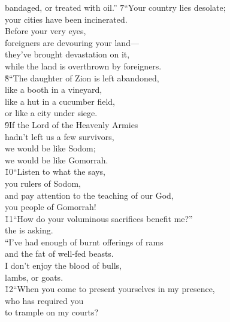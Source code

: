 \begin{poetry}
\poemll    bandaged, or treated with oil.''
\poeml \v{7}``Your country lies desolate; \\
\poemll    your cities have been incinerated. \\
\poeml Before your very eyes, \\
\poemll    foreigners are devouring your land--- \\
\poeml they've brought devastation on it, \\
\poemll    while the land is overthrown by foreigners. \\
\poeml \v{8}``The daughter of Zion is left abandoned, \\
\poemll    like a booth in a vineyard, \\
\poeml like a hut in a cucumber field, \\
\poemll    or like a city under siege. \\
\poeml \v{9}If the Lord of the Heavenly Armies \\
\poemll    hadn't left us a few survivors, \\
\poeml we would be like Sodom; \\
\poemll    we would be like Gomorrah. \\
\poeml \v{10}``Listen to what the  says, \\
\poemll    you rulers of Sodom, \\
\poeml and pay attention to the teaching of our God, \\
\poemll    you people of Gomorrah! \\
\poeml \v{11}``How do your voluminous sacrifices benefit me?'' \\
\poemll    the  is asking. \\
\poeml ``I've had enough of burnt offerings of rams \\
\poemll    and the fat of well-fed beasts. \\
\poeml I don't enjoy the blood of bulls, \\
\poemll    lambs, or goats. \\
\poeml \v{12}``When you come to present yourselves in my presence, \\
\poemll    who has required you \\
\poemlll       to trample on my courts? \\

\end{poetry}
